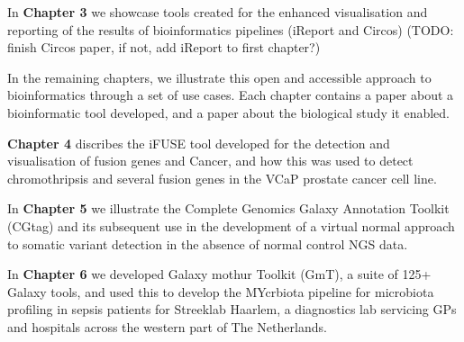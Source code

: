 \begin{justify}
In \textbf{Chapter 3} we showcase tools created for the enhanced visualisation and reporting of the results of bioinformatics pipelines (iReport and Circos) (TODO: finish Circos paper, if not, add iReport to first chapter?)

In the remaining chapters, we illustrate this open and accessible approach to bioinformatics through a set of use cases. Each chapter contains a paper about a bioinformatic tool developed, and a paper about the biological study it enabled.

\textbf{Chapter 4} discribes the iFUSE tool developed for the detection and visualisation of fusion genes and Cancer, and how this was used to detect chromothripsis and several fusion genes in the VCaP prostate cancer cell line.

In \textbf{Chapter 5} we illustrate the Complete Genomics Galaxy Annotation Toolkit (CGtag) and its subsequent use in the development of a virtual normal approach to somatic variant detection in the absence of normal control NGS data.

In \textbf{Chapter 6} we developed Galaxy mothur Toolkit (GmT), a suite of 125+ Galaxy tools, and used this to develop the MYcrbiota pipeline for microbiota profiling in sepsis patients for Streeklab Haarlem, a diagnostics lab servicing GPs and hospitals across the western part of The Netherlands.


\end{justify}



